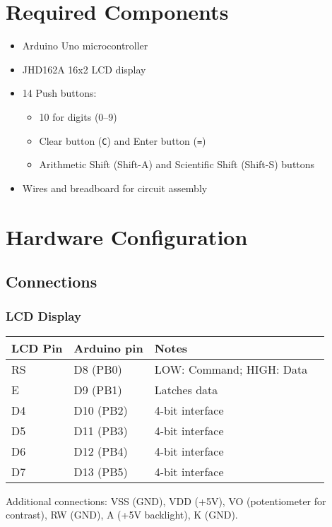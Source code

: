 \documentclass{article}
\theoremstyle{remark}
\begin{document}
\section{Required Components}
\begin{itemize}[noitemsep]
    \item Arduino Uno microcontroller
    \item JHD162A 16x2 LCD display
    \item 14 Push buttons:
    \begin{itemize}[noitemsep]
        \item 10 for digits (0--9)
        \item Clear button (\texttt{C}) and Enter button (\texttt{=})
        \item Arithmetic Shift (Shift-A) and Scientific Shift (Shift-S) buttons
    \end{itemize}
    \item Wires and breadboard for circuit assembly
\end{itemize}

\section{Hardware Configuration}
\subsection{Connections}
\subsubsection{LCD Display}
\begin{center}
\begin{tabular}{|l|l|l|l|}
\hline
	\textbf{LCD Pin}  & \textbf{Arduino pin} & \textbf{Notes} \\ \hline
RS             &  D8 (PB0)           & LOW: Command; HIGH: Data \\ \hline
E              &  D9 (PB1)           & Latches data \\ \hline
D4             &  D10 (PB2)          & 4-bit interface \\ \hline
D5             &  D11 (PB3)          & 4-bit interface \\ \hline
D6              & D12 (PB4)          & 4-bit interface \\ \hline
D7               & D13 (PB5)          & 4-bit interface \\ \hline
\end{tabular}
\end{center}
Additional connections: VSS (GND), VDD (+5V), VO (potentiometer for contrast), RW (GND), A (+5V backlight), K (GND).
\end{document}
